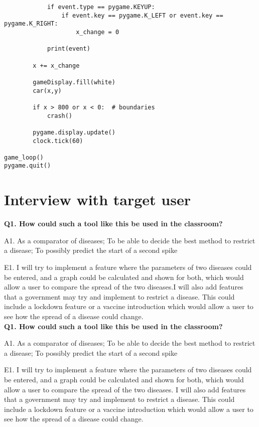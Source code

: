 \documentclass[11pt, a4paper]{article}
\begin{document}
\begin{lstlisting}
            if event.type == pygame.KEYUP:
                if event.key == pygame.K_LEFT or event.key == pygame.K_RIGHT:
                    x_change = 0

            print(event)

        x += x_change

        gameDisplay.fill(white)
        car(x,y)

        if x > 800 or x < 0:  # boundaries
            crash()

        pygame.display.update()
        clock.tick(60)

game_loop()
pygame.quit()
\end{lstlisting}


\newpage
\section{Interview with target user}
\textbf{Q1. How could such a tool like this be used in the classroom?}

A1. As a comparator of diseases; To be able to decide the best method to restrict a disease; To possibly predict the start of a second spike

E1. I will try to implement a feature where the parameters of two diseases could be entered, and a graph could be calculated and shown for both, which would allow a user to compare the spread of the two diseases.I will also add features that a government may try and implement to restrict a disease. This could include a lockdown feature or a vaccine introduction which would allow a user to see how the spread of a disease could change.
\\

\textbf{Q1. How could such a tool like this be used in the classroom?}

A1. As a comparator of diseases; To be able to decide the best method to restrict a disease; To possibly predict the start of a second spike

E1. I will try to implement a feature where the parameters of two diseases could be entered, and a graph could be calculated and shown for both, which would allow a user to compare the spread of the two diseases. I will also add features that a government may try and implement to restrict a disease. This could include a lockdown feature or a vaccine introduction which would allow a user to see how the spread of a disease could change.
\end{document}
